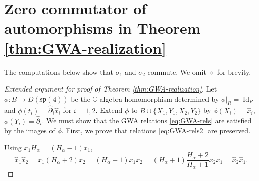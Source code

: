 \documentclass[pdftex]{sigma}
\numberwithin{equation}{section}
\DeclareMathOperator{\Id}{Id}
\begin{document}
\appendix

\section[Zero commutator of automorphisms in Theorem 4.6]{Zero commutator of automorphisms in Theorem \ref{thm:GWA-realization}}\label{Appendix:sec:Zero-Commutator}
The computations below show that $\sigma_{1}$ and $\sigma_{2}$ commute.
We omit $\diamond$ for brevity.

\begin{proof}[Extended argument for proof of Theorem \ref{thm:GWA-realization}]
	Let $\phi\colon B\to D(\mathfrak{sp}(4))$ be the $\mathbb{C}$-algebra homomorphism determined by $\phi|_R=\Id_R$ and $\phi(t_i)=\hat\partial_i\hat x_i$ for $i=1,2$. Extend $\phi$ to $B\cup\{X_1,Y_1,X_2,Y_2\}$ by $\phi(X_i)=\hat x_i$, $\phi(Y_i)=\hat\partial_i$. We must show that the GWA relations \eqref{eq:GWA-rels} are satisfied by the images of $\phi$.
	First, we prove that relations \eqref{eq:GWA-rels2} are preserved.
	
	Using $\bar{x}_1 H_\alpha = (H_\alpha-1)\bar{x}_1$,
	\[
	\hat{x}_1\hat{x}_2 = \bar{x}_1(H_\alpha+2)\bar{x}_2 = (H_\alpha+1)\bar{x}_1\bar{x}_2=(H_\alpha+1)\frac{H_\alpha+2}{H_\alpha+1}\bar{x}_2\bar{x}_1=\hat{x}_2\hat{x}_1.
	\]
	

\end{proof}
\end{document}
